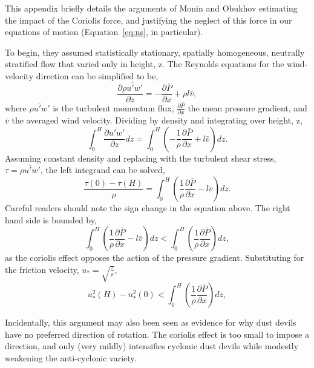 \label{appendix:coriolis}

This appendix briefly details the arguments of Monin and
Obukhov\cite{monin1954basic} estimating the impact of the Coriolis
force, and justifying the neglect of this force in our equations of
motion (Equation~\ref{eq:ns}, in particular). 

To begin, they assumed statistically stationary, spatially homogeneous,
neutrally stratified flow that varied only in height, z. The Reynolds
equations for the wind-velocity direction can be simplified to be,  
\begin{equation}
 \frac{\partial \overline{\rho u'w'}}{\partial z} = -\frac{\partial
  \bar P}{\partial x} + \rho l \bar v, 
\end{equation}
where $\overline{\rho u'w'}$ is the turbulent momentum flux, $\frac{\partial
\bar P}{\partial x} $  the mean pressure gradient, and $\bar v$ the
averaged wind velocity. Dividing by density and integrating over height,
z, 
\begin{equation}
 \int_0^H \frac{\partial \overline{u'w'}}{\partial z} dz = \int_0^H
  \left( -\frac{1}{\rho} \frac{\partial \bar P}{\partial x} + l \bar v
  \right) dz.  
\end{equation}
Assuming constant density and replacing with the turbulent shear stress,
$\tau = \overline{\rho u'w'}$, the left integrand can be solved,  
\begin{equation}
\frac{\tau(0) - \tau(H)}{\rho} = \int_0^H
  \left( \frac{1}{\rho} \frac{\partial \bar P}{\partial x} - l \bar v
  \right) dz.  
\end{equation}
Careful readers should note the sign change in the equation above. The
right hand side is bounded by, 
\begin{equation}
\int_0^H  \left( \frac{1}{\rho} \frac{\partial \bar P}{\partial x} - l \bar v
  \right) dz < \int_0^H  \left( \frac{1}{\rho} \frac{\partial \bar P}{\partial x}  \right) dz,
\end{equation}
as the coriolis effect opposes the action of the pressure
gradient. Substituting for the friction velocity, $u_* =
\sqrt{\frac{\tau}{\rho}}$, 
\begin{equation}
u^2_*(H) - u^2_*(0)  < \int_0^H  \left( \frac{1}{\rho} \frac{\partial \bar P}{\partial x}  \right) dz,
\end{equation}


Incidentally, this argument may also been seen as evidence for why dust
devils have no preferred direction of rotation. The coriolis effect is
too small to impose a direction, and only (very mildly) intensifies
cyclonic dust devils while modestly weakening the anti-cyclonic variety.